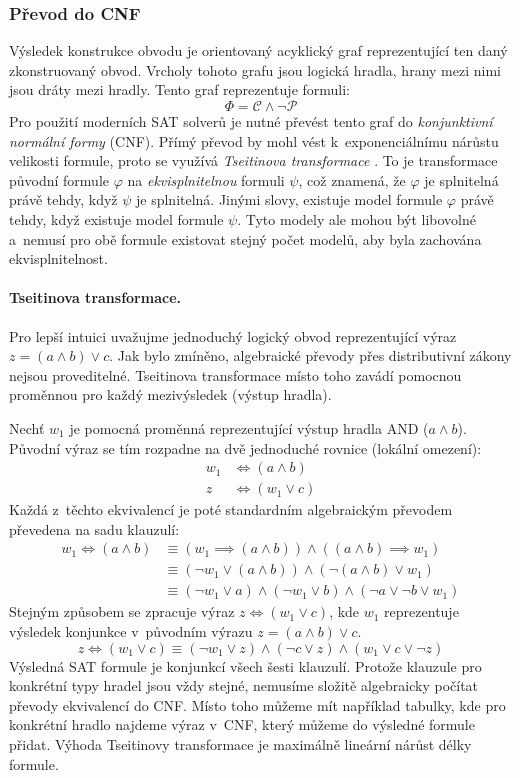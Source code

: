 \documentclass[a4paper, 11pt]{article}
\begin{document}
\subsubsection{Převod do CNF}
Výsledek konstrukce obvodu je orientovaný acyklický graf reprezentující ten daný zkonstruovaný obvod.
Vrcholy tohoto grafu jsou logická hradla, hrany mezi nimi jsou dráty mezi hradly.
Tento graf reprezentuje formuli:
\[
    \Phi = \mathcal{C} \land \neg \mathcal{P}
\]
Pro použití moderních SAT solverů je nutné převést tento graf do \emph{konjunktivní normální formy} (CNF).
Přímý převod by mohl vést k~exponenciálnímu nárůstu velikosti formule, proto se využívá \emph{Tseitinova transformace} \cite{tseitin1983complexity}.
To je transformace původní formule $\varphi$ na \emph{ekvisplnitelnou} formuli $\psi$, což znamená, že $\varphi$ je splnitelná právě tehdy, když $\psi$ je splnitelná.
Jinými slovy, existuje model formule $\varphi$ právě tehdy, když existuje model formule $\psi$.
Tyto modely ale mohou být libovolné a~nemusí pro obě formule existovat stejný počet modelů, aby byla zachována ekvisplnitelnost.

\paragraph{Tseitinova transformace.}
Pro lepší intuici uvažujme jednoduchý logický obvod reprezentující výraz $z = (a \land b) \lor c$.
Jak bylo zmíněno, algebraické převody přes distributivní zákony nejsou proveditelné.
Tseitinova transformace místo toho zavádí pomocnou proměnnou pro každý mezivýsledek (výstup hradla).

Nechť $w_1$ je pomocná proměnná reprezentující výstup hradla AND ($a \land b$).
Původní výraz se tím rozpadne na dvě jednoduché rovnice (lokální omezení):
\begin{align*}
    w_1 & \iff (a \land b)  \\
    z   & \iff (w_1 \lor c)
\end{align*}
Každá z~těchto ekvivalencí je poté standardním algebraickým převodem převedena na sadu klauzulí:
\begin{align*}
    w_1 \iff (a \land b) & \equiv (w_1 \implies (a \land b)) \land ((a \land b) \implies w_1)                   \\
                         & \equiv (\neg w_1 \lor (a \land b)) \land (\neg(a \land b) \lor w_1)                  \\
                         & \equiv (\neg w_1 \lor a) \land (\neg w_1 \lor b) \land (\neg a \lor \neg b \lor w_1)
\end{align*}
Stejným způsobem se zpracuje výraz $z \iff (w_1 \lor c)$, kde $w_1$ reprezentuje výsledek konjunkce v~původním výrazu $z = (a \land b) \lor c$.
\[
    z \iff (w_1 \lor c) \equiv (\neg w_1 \lor z) \land (\neg c \lor z) \land (w_1 \lor c \lor \neg z)
\]
Výsledná SAT formule je konjunkcí všech šesti klauzulí.
Protože klauzule pro konkrétní typy hradel jsou vždy stejné, nemusíme složitě algebraicky počítat převody ekvivalencí do CNF.
Místo toho můžeme mít například tabulky, kde pro konkrétní hradlo najdeme výraz v~CNF, který můžeme do výsledné formule přidat.
Výhoda Tseitinovy transformace je maximálně lineární nárůst délky formule.
\end{document}
